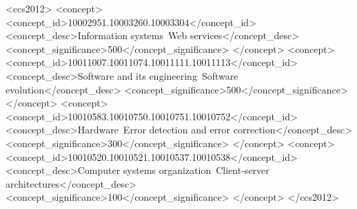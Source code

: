 \begin{CCSXML}
<ccs2012>
<concept>
<concept_id>10002951.10003260.10003304</concept_id>
<concept_desc>Information systems~Web services</concept_desc>
<concept_significance>500</concept_significance>
</concept>
<concept>
<concept_id>10011007.10011074.10011111.10011113</concept_id>
<concept_desc>Software and its engineering~Software evolution</concept_desc>
<concept_significance>500</concept_significance>
</concept>
<concept>
<concept_id>10010583.10010750.10010751.10010752</concept_id>
<concept_desc>Hardware~Error detection and error correction</concept_desc>
<concept_significance>300</concept_significance>
</concept>
<concept>
<concept_id>10010520.10010521.10010537.10010538</concept_id>
<concept_desc>Computer systems organization~Client-server architectures</concept_desc>
<concept_significance>100</concept_significance>
</concept>
</ccs2012>
\end{CCSXML}

